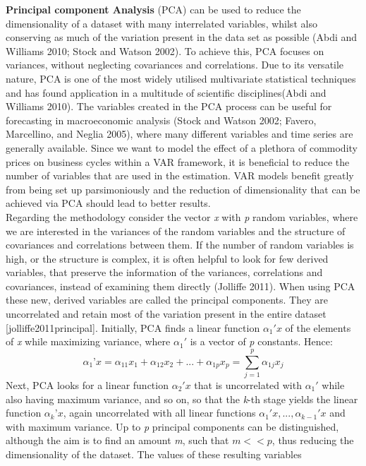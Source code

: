 \documentclass[12pt,]{article}
\begin{document}
\textbf{Principal component Analysis} (PCA) can be used to reduce the
dimensionality of a dataset with many interrelated variables, whilst
also conserving as much of the variation present in the data set as
possible (Abdi and Williams 2010; Stock and Watson 2002). To achieve
this, PCA focuses on variances, without neglecting covariances and
correlations. Due to its versatile nature, PCA is one of the most widely
utilised multivariate statistical techniques and has found application
in a multitude of scientific disciplines(Abdi and Williams 2010). The
variables created in the PCA process can be useful for forecasting in
macroeconomic analysis (Stock and Watson 2002; Favero, Marcellino, and
Neglia 2005), where many different variables and time series are
generally available. Since we want to model the effect of a plethora of
commodity prices on business cycles within a VAR framework, it is
beneficial to reduce the number of variables that are used in the
estimation. VAR models benefit greatly from being set up parsimoniously
and the reduction of dimensionality that can be achieved via PCA should
lead to better results.\\
Regarding the methodology consider the vector \emph{x} with \emph{p}
random variables, where we are interested in the variances of the random
variables and the structure of covariances and correlations between
them. If the number of random variables is high, or the structure is
complex, it is often helpful to look for few derived variables, that
preserve the information of the variances, correlations and covariances,
instead of examining them directly (Jolliffe 2011). When using PCA these
new, derived variables are called the principal components. They are
uncorrelated and retain most of the variation present in the entire
dataset {[}jolliffe2011principal{]}. Initially, PCA finds a linear
function \(\alpha_1' x\) of the elements of \emph{x} while maximizing
variance, where \(\alpha_1'\) is a vector of \emph{p} constants. Hence:
\[\alpha_1’x = \alpha_{11} x_1 + \alpha_{12} x_2 + ... + \alpha_{1p} x_p = \sum_{j=1}^p \alpha_{1j} x_j\]
Next, PCA looks for a linear function \(\alpha_2' x\) that is
uncorrelated with \(\alpha_1'\) while also having maximum variance, and
so on, so that the \emph{k}-th stage yields the linear function
\(\alpha_k’ x\), again uncorrelated with all linear functions
\(\alpha_1' x, ..., \alpha_{k-1}' x\) and with maximum variance. Up to
\emph{p} principal components can be distinguished, although the aim is
to find an amount \emph{m}, such that \(m<<p\), thus reducing the
dimensionality of the dataset. The values of these resulting variables
\end{document}
